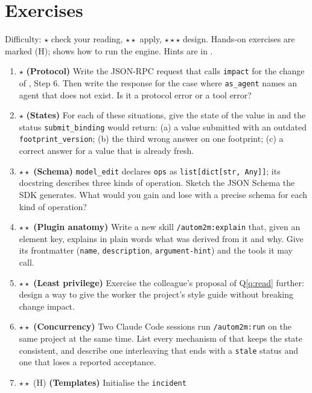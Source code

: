 \documentclass[10pt,a4paper]{article}
\newcommand{\cc}{Claude Code}
\newcommand{\code}[1]{\texttt{#1}}
\newcommand{\mcptool}[1]{\texttt{#1}}
\newcommand{\skill}[1]{\texttt{/autom2m:#1}}
\begin{document}
\section{Exercises}\label{sec:exercises}

Difficulty: $\star$ check your reading, $\star\star$ apply, $\star\star\star$
design. Hands-on exercises are marked (H);  shows how to run
the engine. Hints are in .

\begin{enumerate}[leftmargin=1.6em, itemsep=4pt]
\item $\star$ \textbf{(Protocol)} Write the JSON-RPC request that calls
\mcptool{impact} for the change of , Step 6. Then write the
response for the case where \code{as\_agent} names an agent that does not
exist. Is it a protocol error or a tool error?
\item $\star$ \textbf{(States)} For each of these situations, give the state
of the value in  and the status \mcptool{submit\_binding}
would return: (a) a value submitted with an outdated
\code{footprint\_version}; (b) the third wrong answer on one footprint; (c) a
correct answer for a value that is already fresh.
\item $\star\star$ \textbf{(Schema)} \mcptool{model\_edit} declares \code{ops}
as \code{list[dict[str, Any]]}; its docstring describes three kinds of
operation. Sketch the JSON Schema the SDK generates. What would you gain and
lose with a precise schema for each kind of operation?
\item $\star\star$ \textbf{(Plugin anatomy)} Write a new skill
\skill{explain} that, given an element key, explains in plain words what was
derived from it and why. Give its frontmatter (\code{name},
\code{description}, \code{argument-hint}) and the tools it may call.
\item $\star\star$ \textbf{(Least privilege)} Exercise the colleague's
proposal of Q\ref{q:read} further: design a way to give the worker the
project's style guide without breaking change impact.
\item $\star\star$ \textbf{(Concurrency)} Two \cc{} sessions run \skill{run}
on the same project at the same time. List every mechanism of
 that keeps the state consistent, and describe one
interleaving that ends with a \code{stale} status and one that loses a
reported acceptance.
\item $\star\star$ (H) \textbf{(Templates)} Initialise the \code{incident}

\end{enumerate}
\end{document}
